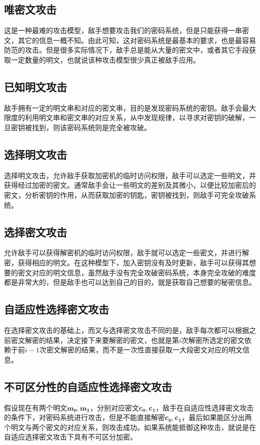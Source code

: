 \subsection{唯密文攻击}
这是一种最难的攻击模型，敌手想要攻击我们的密码系统，但是只能获得一串密文，其它的信息一概不知。由此可知，这对密码系统是最基本的要求，也是最容易防范的攻击。但是很多实际情况下，敌手总是能从大量的密文中，或者其它手段获取一定数量的明文，也就说该种攻击模型很少真正被敌手应用。

\subsection{已知明文攻击}
敌手拥有一定的明文串和对应的密文串，目的是发现密码系统的密钥。敌手会最大限度的利用明文串和密文串的对应关系，从中发现规律，以寻求对密钥的破解，一旦密钥被找到，则该密码系统则是完全被攻破。

\subsection{选择明文攻击}
选择明文攻击，允许敌手获取加密机的临时访问权限，敌手可以选定一些明文，并获得经过加密的密文。通常敌手会让一些明文的差别及其微小，以便比较加密后的密文，分析密钥的作用，从而获取加密的钥匙，密钥被找到，则敌手可完全攻破系统。

\subsection{选择密文攻击}
允许敌手可以获得解密机的临时访问权限，敌手就可以选定一些密文，并进行解密，获得相应的明文。在这种模型下，加入密钥没有及时更新，敌手可以获得其想要的密文对应的明文信息，虽然敌手没有完全攻破密码系统，本身完全攻破的难度都是非常大的，但是敌手也可以达到自己的目的，就是获取自己想要的秘密信息。

\subsection{自适应性选择密文攻击}
在选择密文攻击的基础上，而又与选择密文攻击不同的是，敌手每次都可以根据之前密文解密的结果，决定接下来要解密的密文，也就是第$i$次解密所选定的密文依赖于前$i - 1$次密文解密的结果，而不是一次性直接获取一大段密文对应的明文信息。

\subsection{不可区分性的自适应性选择密文攻击}
假设现在有两个明文$\mathbf{m_0},\mathbf{m_1}$，分别对应密文$\mathbf{c_0},\mathbf{c_1}$，敌手在自适应性选择密文攻击的条件下，对密码系统进行攻击，但是不能直接解密$\mathbf{c_0},\mathbf{c_1}$，最后如果能区分出两个明文与两个密文的对应关系，则攻击成功。如果系统能抵御这种攻击，就说是在自适应选择密文攻击下具有不可区分加密。

